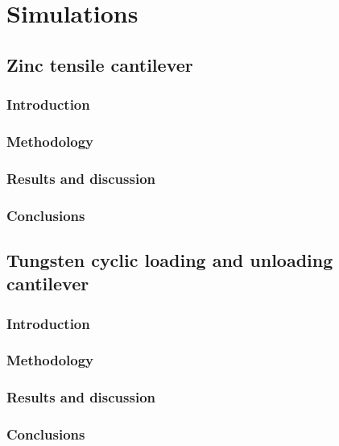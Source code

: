\chapter{Simulations}\label{c:simulations}

\section{Zinc tensile cantilever}\label{s:zincTensile}
\subsection{Introduction}
\subsection{Methodology}
\subsection{Results and discussion}
\subsection{Conclusions}

\section{Tungsten cyclic loading and unloading cantilever}\label{s:tungstenCyclic}
\subsection{Introduction}
\subsection{Methodology}
\subsection{Results and discussion}
\subsection{Conclusions}